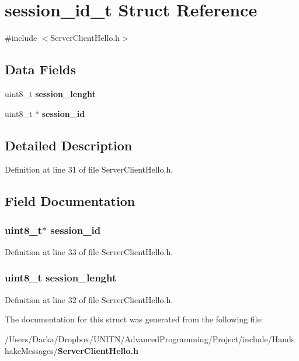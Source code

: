 \section{session\+\_\+id\+\_\+t Struct Reference}
\label{structsession__id__t}


{\ttfamily \#include $<$Server\+Client\+Hello.\+h$>$}

\subsection*{Data Fields}
\begin{DoxyCompactItemize}
\item 
uint8\+\_\+t {\bf session\+\_\+lenght}
\item 
uint8\+\_\+t $\ast$ {\bf session\+\_\+id}
\end{DoxyCompactItemize}


\subsection{Detailed Description}


Definition at line 31 of file Server\+Client\+Hello.\+h.



\subsection{Field Documentation}
\subsubsection[{session\+\_\+id}]{\setlength{\rightskip}{0pt plus 5cm}uint8\+\_\+t$\ast$ {\bf session\+\_\+id}}\label{structsession__id__t_a3b231942489a1a1830e29141488df646}


Definition at line 33 of file Server\+Client\+Hello.\+h.

\subsubsection[{session\+\_\+lenght}]{\setlength{\rightskip}{0pt plus 5cm}uint8\+\_\+t session\+\_\+lenght}\label{structsession__id__t_a9215daa8dba2536b15b9029e18017c3a}


Definition at line 32 of file Server\+Client\+Hello.\+h.



The documentation for this struct was generated from the following file\+:\begin{DoxyCompactItemize}
\item 
/\+Users/\+Darka/\+Dropbox/\+U\+N\+I\+T\+N/\+Advanced\+Programming/\+Project/include/\+Handshake\+Messages/{\bf Server\+Client\+Hello.\+h}\end{DoxyCompactItemize}
